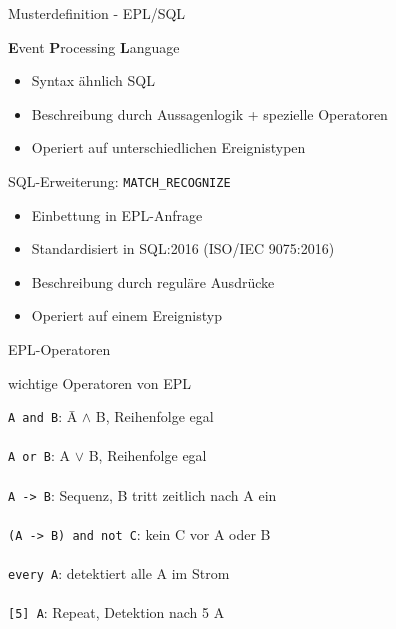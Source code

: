 \documentclass[usenames,dvipsnames]{beamer}
\begin{document}
\begin{frame}{Musterdefinition - EPL/SQL}

\begin{exampleblock}{\textbf{E}vent \textbf{P}rocessing \textbf{L}anguage}
    \begin{itemize}
        \item Syntax ähnlich SQL
        \item Beschreibung durch Aussagenlogik + spezielle Operatoren
        \item Operiert auf unterschiedlichen Ereignistypen
    \end{itemize}

\end{exampleblock}

\begin{exampleblock}{SQL-Erweiterung: \texttt{MATCH\_RECOGNIZE}}
\begin{itemize}
    \item Einbettung in EPL-Anfrage
    \item Standardisiert in SQL:2016 (ISO/IEC 9075:2016)
    \item Beschreibung durch reguläre Ausdrücke
    \item Operiert auf einem Ereignistyp
\end{itemize}
\end{exampleblock}
   
\end{frame}

\begin{frame}{EPL-Operatoren}

\begin{block}{\centering wichtige Operatoren von EPL}
    \begin{tabbing}
        \texttt{A and B}:\hspace{3cm}  \=   A $\land$ B, Reihenfolge egal\\\\
        \texttt{A or B}: \>     A $\lor$ B, Reihenfolge egal\\\\
        \texttt{A -> B}: \>     Sequenz, B tritt zeitlich nach A ein\\\\
        \texttt{(A -> B) and not C}: \>     kein C vor A oder B\\\\
        \texttt{every A}: \>        detektiert alle A im Strom\\\\
        \texttt{[5] A}: \> Repeat, Detektion nach 5 A          
        
    \end{tabbing}
\end{block}


\end{frame}
\end{document}
